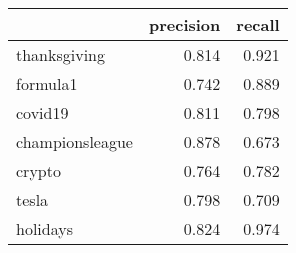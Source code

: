 \begin{tabular}{lrr}
\toprule
{} &  precision &  recall \\
\midrule
thanksgiving    &      0.814 &   0.921 \\
formula1        &      0.742 &   0.889 \\
covid19         &      0.811 &   0.798 \\
championsleague &      0.878 &   0.673 \\
crypto          &      0.764 &   0.782 \\
tesla           &      0.798 &   0.709 \\
holidays        &      0.824 &   0.974 \\
\bottomrule
\end{tabular}
